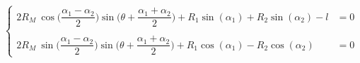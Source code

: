 \documentclass[12pt,a4paper]{article}
\begin{document}
\begin{equation*}
\begin{cases}
2 R_M \ \cos\bigg(\dfrac{\alpha_1 - \alpha_2}{2} \bigg) \sin \bigg( \theta + \dfrac{\alpha_1 + \alpha_2}{2} \bigg) + R_1 \sin(\alpha_1) + R_2 \sin(\alpha_2) - l &= 0 \\ 
\\
2 R_M \ \sin\bigg(\dfrac{\alpha_1 - \alpha_2}{2} \bigg) \sin \bigg( \theta + \dfrac{\alpha_1 + \alpha_2}{2} \bigg) + R_1 \cos(\alpha_1) - R_2 \cos(\alpha_2)& = 0
\end{cases}
\end{equation*}
\end{document}
